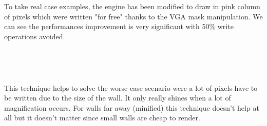 To take real case examples, the engine has been modified to draw in pink column of pixels which were written "for free" thanks to the VGA mask manipulation. We can see the performances improvement is very significant with 50\% write operations avoided.

\begin{minipage}{\textwidth}
 \centering
\vspace*{0.5cm}\\

\end{minipage}



\par

\begin{minipage}{\textwidth}
 \centering
 \vspace*{0.5cm}\\
\end{minipage}
This technique helps to solve the worse case scenario were a lot of pixels have to be written due to the size of the wall. It only really shines when a lot of magnification occurs. For walls far away (minified) this technique doesn't help at all but it doesn't matter since small walls are cheap to render.\\






















